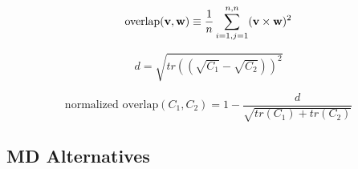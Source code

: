\begin{equation}
\text{overlap}(\mathbf{v}, \mathbf{w}) \equiv \frac{1}{n} \sum_{i=1, j=1}^{n,n} (\mathbf{v} \times \mathbf{w}) ^ 2
\end{equation}

\begin{equation}
d = \sqrt{tr((\sqrt{C_1} - \sqrt{C_2}))^2}
\end{equation}

\begin{equation}
\text{normalized overlap} (C_1, C_2) = 1 - \frac{d}{\sqrt{tr(C_1) + tr(C_2)}}
\end{equation}











\subsection{MD Alternatives}


